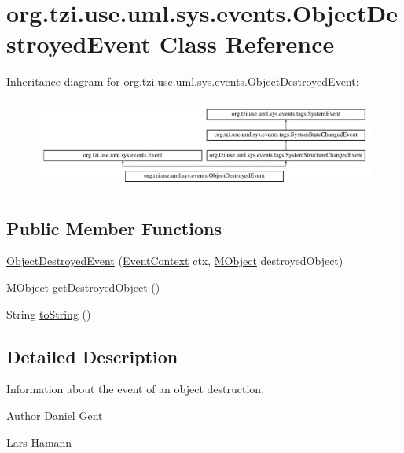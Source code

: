 \hypertarget{classorg_1_1tzi_1_1use_1_1uml_1_1sys_1_1events_1_1_object_destroyed_event}{\section{org.\-tzi.\-use.\-uml.\-sys.\-events.\-Object\-Destroyed\-Event Class Reference}
\label{classorg_1_1tzi_1_1use_1_1uml_1_1sys_1_1events_1_1_object_destroyed_event}
}
Inheritance diagram for org.\-tzi.\-use.\-uml.\-sys.\-events.\-Object\-Destroyed\-Event\-:\begin{figure}[H]
\begin{center}
\leavevmode
\includegraphics[height=3.010753cm]{classorg_1_1tzi_1_1use_1_1uml_1_1sys_1_1events_1_1_object_destroyed_event}
\end{center}
\end{figure}
\subsection*{Public Member Functions}
\begin{DoxyCompactItemize}
\item 
\hyperlink{classorg_1_1tzi_1_1use_1_1uml_1_1sys_1_1events_1_1_object_destroyed_event_a83a4ea2f7604a9ef49b6493ce4608a9b}{Object\-Destroyed\-Event} (\hyperlink{enumorg_1_1tzi_1_1use_1_1uml_1_1sys_1_1events_1_1tags_1_1_event_context}{Event\-Context} ctx, \hyperlink{interfaceorg_1_1tzi_1_1use_1_1uml_1_1sys_1_1_m_object}{M\-Object} destroyed\-Object)
\item 
\hyperlink{interfaceorg_1_1tzi_1_1use_1_1uml_1_1sys_1_1_m_object}{M\-Object} \hyperlink{classorg_1_1tzi_1_1use_1_1uml_1_1sys_1_1events_1_1_object_destroyed_event_aaaa3e79199e043e97070f3fa9632d4b6}{get\-Destroyed\-Object} ()
\item 
String \hyperlink{classorg_1_1tzi_1_1use_1_1uml_1_1sys_1_1events_1_1_object_destroyed_event_ab5148647c713088fe7e3de97a49a4506}{to\-String} ()
\end{DoxyCompactItemize}


\subsection{Detailed Description}
Information about the event of an object destruction. \begin{DoxyAuthor}{Author}
Daniel Gent 

Lars Hamann 
\end{DoxyAuthor}


